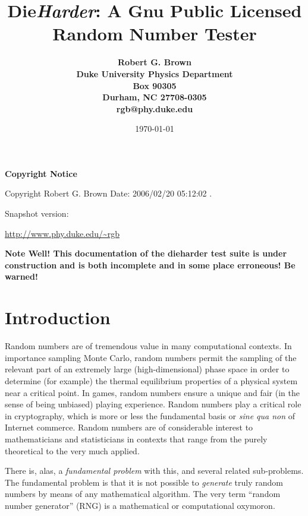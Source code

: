 \documentclass[12pt]{article}
\begin{document}
\title{Die{\em Harder}: A Gnu Public Licensed Random Number Tester}

\date{\today}

\author{\bf Robert G. Brown \\
Duke University Physics Department \\
Box 90305 \\
Durham, NC 27708-0305 \\
rgb@phy.duke.edu}

\maketitle

\vspace*{\fill}

\centerline{\large \bf Copyright Notice}
\centerline{Copyright Robert G. Brown 
$ $Date: 2006/02/20 05:12:02 $.$ }
\centerline{Snapshot version: \version}

\url{http://www.phy.duke.edu/~rgb}

\newpage

\tableofcontents

\newpage

{\large \bf Note Well!  This documentation of the dieharder test suite
is under construction and is both incomplete and in some place
erroneous!  Be warned!}

\section{Introduction}

Random numbers are of tremendous value in many computational contexts.
In importance sampling Monte Carlo, random numbers permit the sampling
of the relevant part of an extremely large (high-dimensional) phase
space in order to determine (for example) the thermal equilibrium
properties of a physical system near a critical point.  In games, random
numbers ensure a unique and fair (in the sense of being unbiased)
playing experience.  Random numbers play a critical role in
cryptography, which is more or less the fundamental basis or {\em sine
qua non} of Internet commerce.  Random numbers are of considerable
interest to mathematicians and statisticians in contexts that range from
the purely theoretical to the very much applied.

There is, alas, a {\em fundamental problem} with this, and several
related sub-problems.  The fundamental problem is that it is not
possible to {\em generate} truly random numbers by means of any
mathematical algorithm.  The very term ``random number generator'' (RNG)
is a mathematical or computational oxymoron.  
\end{document}
